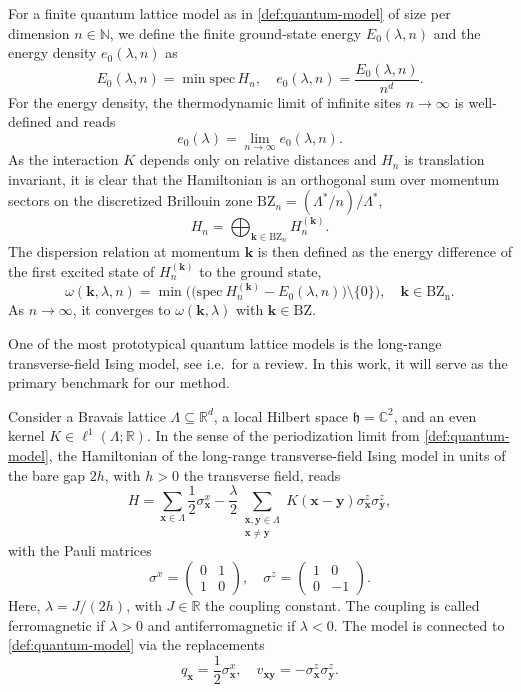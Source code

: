 \documentclass[]{amsart}
\numberwithin{mythm}{section}
\begin{document}
\begin{definition}
For a finite quantum lattice model as in \cref{def:quantum-model} of size per dimension $n\in \mathds N$, we define the finite  ground-state energy $E_0(\lambda,n)$ and the energy density $e_0(\lambda,n)$ as 
\[
E_0(\lambda,n) =  \min\mathrm{spec}\,H_n,\quad e_0(\lambda,n) = \frac{E_0(\lambda,n)}{n^d}.
\]
For the energy density, the thermodynamic limit of infinite sites $n\to \infty$ is well-defined and reads
\[
e_0(\lambda)=\lim_{n\to \infty} e_0(\lambda,n).
\]
As the interaction $K$ depends only on relative distances and $H_n$ is translation invariant, it is clear that the Hamiltonian is an orthogonal sum over momentum sectors on the discretized Brillouin zone $\mathrm{BZ}_n=(\Lambda^\ast/n)/\Lambda^\ast$,
\[
H_n= \bigoplus_{\bm k\in \mathrm{BZ}_n}  H_n^{(\bm k)}.
\]
The dispersion relation at momentum $\bm k$ is then defined as the energy difference of the first excited state of $H_n^{(\bm k)}$ to the ground state,
\[
\omega(\bm k,\lambda,n) = \min \bigg(\big(\mathrm{spec}~H_n^{(\bm k)}-E_0(\lambda,n)\big)\setminus\{0\}\bigg),\quad \bm k \in \mathrm{BZ_n}.
\]
As $n\to \infty$, it converges to $\omega(\bm k,\lambda)$ with $\bm k\in \mathrm{BZ}$.
\end{definition}


One of the most prototypical quantum lattice models is the long-range transverse-field Ising model, see i.e.\,\cite{adelhardt2024monte} for a review. In this work, it will serve as the primary benchmark for our method. 
\begin{definition}
    \label{def:lrtfim}
    Consider a Bravais lattice $\Lambda\subseteq \mathds R^d$, a local Hilbert space $\mathfrak h=\mathds C^2$, and an even kernel $K\in \ell^1(\Lambda;\mathds R)$. In the sense of the periodization limit from \cref{def:quantum-model}, the Hamiltonian of the long-range transverse-field Ising model in units of the bare gap $2h$, with $h>0$ the transverse field, reads 
    \[
    H=\sum_{\bm x\in \Lambda} \frac{1}{2}\sigma^{x}_{\bm x}-\frac{\lambda}{2} \sum_{\substack{\bm x,\bm y\in \Lambda\\ \bm x\neq\bm y}} K(\bm x-\bm y)\sigma^z_{\bm x} \sigma^z_{\bm y},
    \]
    with the Pauli matrices
    \[
    \sigma^x=\begin{pmatrix}
        0 & 1\\
        1 & 0
    \end{pmatrix},\quad \sigma^z = \begin{pmatrix}
        1 & 0\\
        0 & -1
    \end{pmatrix}.
    \]
    Here, $\lambda=J/(2h)$, with $J\in \mathds R$ the coupling constant. The coupling is called ferromagnetic if $\lambda>0$ and antiferromagnetic if $\lambda<0$.
    The model is connected to \cref{def:quantum-model} via the replacements
    \[
    q_{\bm x}=\frac{1}{2}\sigma^x_{\bm x},\quad v_{\bm x\bm y}=-\sigma^z_{\bm x} \sigma^z_{\bm y}.
    \]
\end{definition}
\end{document}
